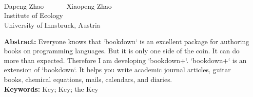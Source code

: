 \begin{center}
\parbox{\textwidth}{
\\[5pt]

\\[5pt]
}
\end{center}

\begin{center}
\\[7pt]
\normalsize
Dapeng Zhao~~~~~~
Xiaopeng Zhao~~~~~~
\\[7pt]
\xiaowuhao Institute of Ecology\\
University of Innsbruck, Austria\\[10pt]
\end{center}
\begin{center}
\parbox{\textwidth}{
\textbf{Abstract:} 
Everyone knows that `bookdown` is an excellent package for authoring books on programming languages. But it is only one side of the coin.  It can do more than expected. Therefore I am developing `bookdown+`. `bookdown+` is an extension of `bookdown`. It helps you write academic journal articles, guitar books, chemical equations, mails, calendars, and diaries.
\\[4pt]
\textbf{Keywords:} 
Key; Key; the Key
}

\end{center}
